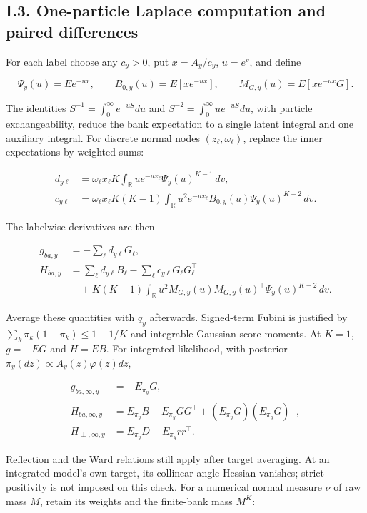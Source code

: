 \documentclass{article}
\begin{document}
\subsection*{I.3. One-particle Laplace computation and paired
differences}\label{laplace-representation}

For each label choose any \(c_y>0\), put \(x=A_y/c_y\), \(u=e^v\), and
define

\[
\Psi_y(u)=E e^{-ux},\qquad B_{0,y}(u)=E[xe^{-ux}],\qquad M_{G,y}(u)=E[xe^{-ux}G].
\tag{I.13}
\]

The identities \(S^{-1}=\int_0^\infty e^{-uS}du\) and
\(S^{-2}=\int_0^\infty ue^{-uS}du\), with particle exchangeability,
reduce the bank expectation to a single latent integral and one
auxiliary integral. For discrete normal nodes \((z_\ell,\omega_\ell)\),
replace the inner expectations by weighted sums:

\[
\begin{aligned}
d_{y\ell}&=\omega_\ell x_\ell K\int_{\mathbb R}u e^{-ux_\ell}\Psi_y(u)^{K-1}\,dv,\\
c_{y\ell}&=\omega_\ell x_\ell K(K-1)\int_{\mathbb R}u^2e^{-ux_\ell}B_{0,y}(u)\Psi_y(u)^{K-2}\,dv.
\end{aligned}
\tag{I.14}
\]

The labelwise derivatives are then

\[
\begin{aligned}
g_{ba,y}&=-\sum_\ell d_{y\ell}G_\ell,\\
H_{ba,y}&=\sum_\ell d_{y\ell}B_\ell-\sum_\ell c_{y\ell}G_\ell G_\ell^\top\\
&\quad+K(K-1)\int_{\mathbb R}u^2M_{G,y}(u)M_{G,y}(u)^\top\Psi_y(u)^{K-2}\,dv.
\end{aligned}
\tag{I.15}
\]

Average these quantities with \(q_y\) afterwards. Signed-term Fubini is
justified by \(\sum_k\pi_k(1-\pi_k)\le1-1/K\) and integrable Gaussian
score moments. At \(K=1\), \(g=-EG\) and \(H=EB\). For integrated
likelihood, with posterior \(\pi_y(dz)\propto A_y(z)\varphi(z)dz\),

\[
\begin{aligned}
g_{ba,\infty,y}&=-E_{\pi_y}G,\\
H_{ba,\infty,y}&=E_{\pi_y}B-E_{\pi_y}GG^\top
+(E_{\pi_y}G)(E_{\pi_y}G)^\top,\\
H_{\perp,\infty,y}&=E_{\pi_y}D-E_{\pi_y}rr^\top.
\end{aligned}
\tag{I.16}
\]

Reflection and the Ward relations still apply after target averaging. At
an integrated model's own target, its collinear angle Hessian vanishes;
strict positivity is not imposed on this check. For a numerical normal
measure \(\nu\) of raw mass \(M\), retain its weights and the
finite-bank mass \(M^K\):
\end{document}
